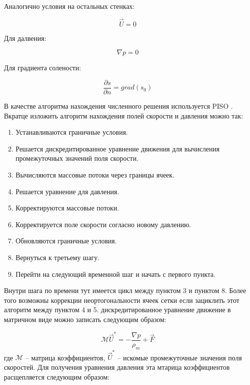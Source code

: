 Аналогично условия на остальных стенках:

\begin{equation}
    \vec{U} = 0
\end{equation}

Для далвения:

\begin{equation}
    \nabla p = 0
\end{equation}

Для градиента солености:

\begin{equation}
    \frac{\partial s}{\partial n} = grad(s_0)
\end{equation}

В качестве алгоритма нахождения численного решения используется PISO \cite{IssaGosmanWatkins-PISO}. Вкратце изложить алгоритм нахождения полей скорости и давления можно так:
\begin{enumerate}[1.]
    \item Устанавливаются граничные условия.
    \item Решается дискредитированное уравнение движения для вычисления промежуточных значений поля скорости.
    \item Вычисляются массовые потоки через границы ячеек.
    \item Решается уравнение для давления.
    \item Корректируются массовые потоки.
    \item Корректируется поле скорости согласно новому давлению.
    \item Обновляются граничные условия.
    \item Вернуться к третьему шагу.
    \item Перейти на следующий временной шаг и начать с первого пункта.
\end{enumerate}
Внутри шага по времени тут имеется цикл между пунктом 3 и пунктом 8. Более того возможны коррекции неортогональности ячеек сетки если зациклить этот алгоритм между пунктом 4 и 5. дискредитированное уравнение движение в матричном виде можно записать следующим образом: 

\begin{equation}
    \mathcal{M} \vec{U}^* = -\frac{\nabla p}{\rho_m} + \vec{F}
\end{equation}
где $\mathcal{M}$ -- матрица коэффициентов, $\vec{U}^*$ -- искомые промежуточные значения поля скоростей. Для получения уравнения давления эта мтарица коэффициентов расщепляется следующим образом:

